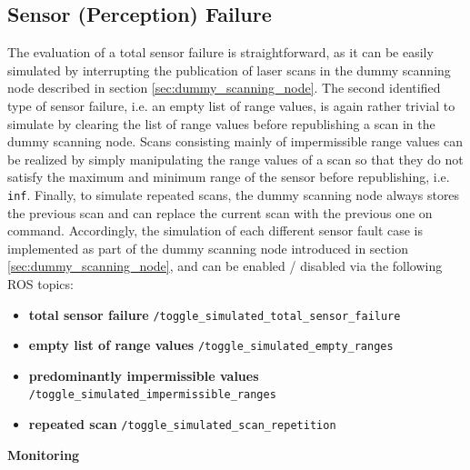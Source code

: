 \documentclass[english, master, utf8]{base/thesis_KBS}
\newcommand{\code}[1]{\colorbox{light-gray}{\texttt{#1}}}
\begin{document}
\subsection{Sensor (Perception) Failure}
\label{sec:sim_and_mon_sensor_failures}

The evaluation of a total sensor failure is straightforward, as it can be easily simulated by interrupting the publication of laser scans in the dummy scanning node
described in section \ref{sec:dummy_scanning_node}. The second identified type of sensor failure, i.e. an empty list of range values, is again rather trivial to simulate
by clearing the list of range values before republishing a scan in the dummy scanning node. Scans consisting mainly of impermissible range values can be realized by 
simply manipulating the range values of a scan so that they do not satisfy the maximum and minimum range of the sensor before republishing, i.e. \code{inf}.
Finally, to simulate repeated scans, the dummy scanning node always stores the previous scan and can replace the current scan with the previous one on command.
Accordingly, the simulation of each different sensor fault case is implemented as part of the dummy scanning node introduced in section \ref{sec:dummy_scanning_node},
and can be enabled / disabled via the following ROS topics:
\begin{itemize}
    \item \textbf{total sensor failure} \textrightarrow \code{/toggle\_simulated\_total\_sensor\_failure}
    \item \textbf{empty list of range values} \textrightarrow \code{/toggle\_simulated\_empty\_ranges}
    \item \textbf{predominantly impermissible values} \textrightarrow \code{/toggle\_simulated\_impermissible\_ranges}
    \item \textbf{repeated scan} \textrightarrow \code{/toggle\_simulated\_scan\_repetition}\newline
\end{itemize}

\noindent
\textbf{Monitoring}\newline
\end{document}
